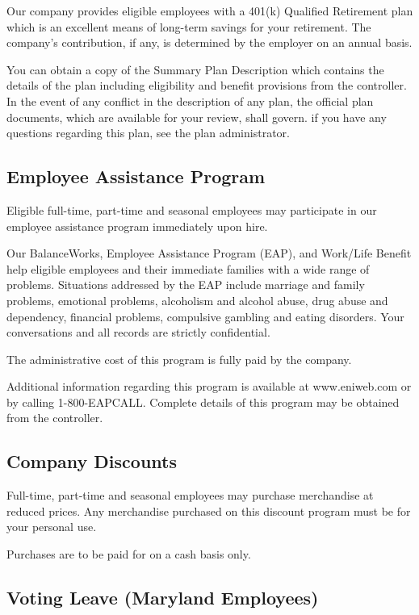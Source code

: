 Our company provides eligible employees with a 401(k) Qualified Retirement plan which is an excellent means of long-term savings for your retirement. The company's contribution, if any, is determined by the employer on an annual basis.

You can obtain a copy of the Summary Plan Description which contains the details of the plan including eligibility and benefit provisions from the controller. In the event of any conflict in the description of any plan, the official plan documents, which are available for your review, shall govern. if you have any questions regarding this plan, see the plan administrator.

\subsection{Employee Assistance Program}

Eligible full-time, part-time and seasonal employees may participate in our employee assistance program immediately upon hire.

Our BalanceWorks\textcopyright, Employee Assistance Program (EAP), and Work/Life Benefit help eligible employees and their immediate families with a wide range of problems. Situations addressed by the EAP include marriage and family problems, emotional problems, alcoholism and alcohol abuse, drug abuse and dependency, financial problems, compulsive gambling and eating disorders. Your conversations and all records are strictly confidential.

The administrative cost of this program is fully paid by the company.

Additional information regarding this program is available at www.eniweb.com or by calling 1-800-EAPCALL. Complete details of this program may be obtained from the controller.

\subsection{Company Discounts}

Full-time, part-time and seasonal employees may purchase merchandise at reduced prices. Any merchandise purchased on this discount program must be for your personal use.

Purchases are to be paid for on a cash basis only.

\subsection{Voting Leave (Maryland Employees)}

